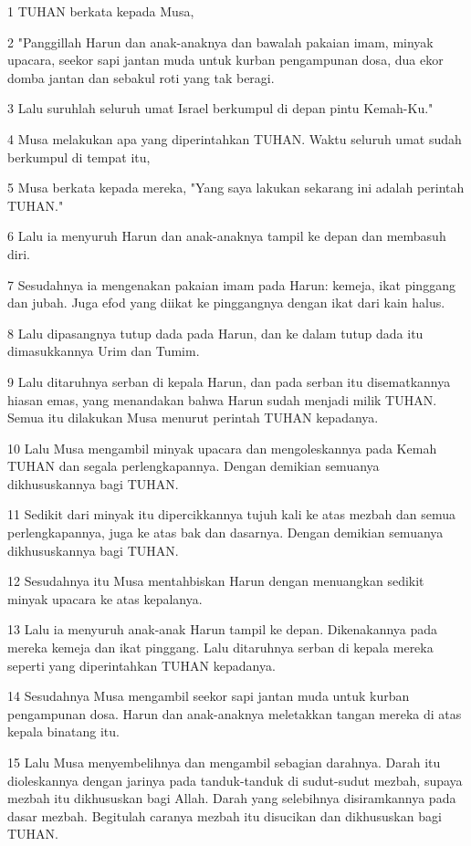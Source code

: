 \par 1 TUHAN berkata kepada Musa,
\par 2 "Panggillah Harun dan anak-anaknya dan bawalah pakaian imam, minyak upacara, seekor sapi jantan muda untuk kurban pengampunan dosa, dua ekor domba jantan dan sebakul roti yang tak beragi.
\par 3 Lalu suruhlah seluruh umat Israel berkumpul di depan pintu Kemah-Ku."
\par 4 Musa melakukan apa yang diperintahkan TUHAN. Waktu seluruh umat sudah berkumpul di tempat itu,
\par 5 Musa berkata kepada mereka, "Yang saya lakukan sekarang ini adalah perintah TUHAN."
\par 6 Lalu ia menyuruh Harun dan anak-anaknya tampil ke depan dan membasuh diri.
\par 7 Sesudahnya ia mengenakan pakaian imam pada Harun: kemeja, ikat pinggang dan jubah. Juga efod yang diikat ke pinggangnya dengan ikat dari kain halus.
\par 8 Lalu dipasangnya tutup dada pada Harun, dan ke dalam tutup dada itu dimasukkannya Urim dan Tumim.
\par 9 Lalu ditaruhnya serban di kepala Harun, dan pada serban itu disematkannya hiasan emas, yang menandakan bahwa Harun sudah menjadi milik TUHAN. Semua itu dilakukan Musa menurut perintah TUHAN kepadanya.
\par 10 Lalu Musa mengambil minyak upacara dan mengoleskannya pada Kemah TUHAN dan segala perlengkapannya. Dengan demikian semuanya dikhususkannya bagi TUHAN.
\par 11 Sedikit dari minyak itu dipercikkannya tujuh kali ke atas mezbah dan semua perlengkapannya, juga ke atas bak dan dasarnya. Dengan demikian semuanya dikhususkannya bagi TUHAN.
\par 12 Sesudahnya itu Musa mentahbiskan Harun dengan menuangkan sedikit minyak upacara ke atas kepalanya.
\par 13 Lalu ia menyuruh anak-anak Harun tampil ke depan. Dikenakannya pada mereka kemeja dan ikat pinggang. Lalu ditaruhnya serban di kepala mereka seperti yang diperintahkan TUHAN kepadanya.
\par 14 Sesudahnya Musa mengambil seekor sapi jantan muda untuk kurban pengampunan dosa. Harun dan anak-anaknya meletakkan tangan mereka di atas kepala binatang itu.
\par 15 Lalu Musa menyembelihnya dan mengambil sebagian darahnya. Darah itu dioleskannya dengan jarinya pada tanduk-tanduk di sudut-sudut mezbah, supaya mezbah itu dikhususkan bagi Allah. Darah yang selebihnya disiramkannya pada dasar mezbah. Begitulah caranya mezbah itu disucikan dan dikhususkan bagi TUHAN.
